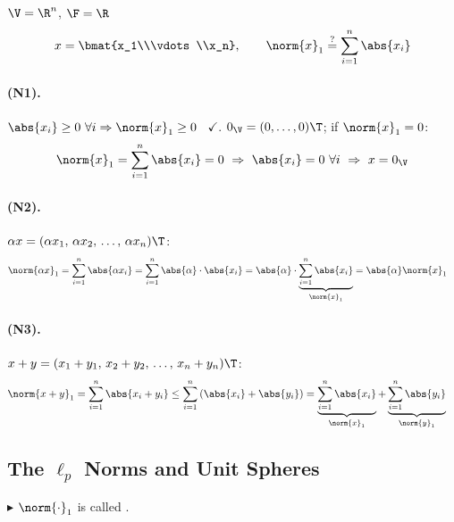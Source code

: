 \begin{example}
$\V=\R^n$, $\F=\R$
\[
x = \bmat{x_1\\\vdots\\x_n}, \qquad \norm{x}_1 \overset{?}{=} \sum_{i=1}^{n}\abs{x_i}
\]
\paragraph{(N1).} $\abs{x_i}\ge0\ \forall i \Rightarrow \norm{x}_1\ge0$ \ $\checkmark$. \quad $0_{\V} = (0,\dots,0)\T$; if $\norm{x}_1=0$:
\[
\norm{x}_1 = \sum_{i=1}^{n}\abs{x_i} = 0
\ \Rightarrow\ \abs{x_i}=0 \ \forall i
\ \Rightarrow\ x=0_{\V}
\]
\paragraph{(N2).} $\alpha x = (\alpha x_1,\, \alpha x_2,\, \dots,\, \alpha x_n)\T$:
\begin{align*}
\norm{\alpha x}_1 &= \sum_{i=1}^{n}\abs{\alpha x_i} = \sum_{i=1}^{n}\abs{\alpha}\cdot\abs{x_i}
= \abs{\alpha}\cdot\underbrace{\sum_{i=1}^{n}\abs{x_i}}_{\norm{x}_1} = \abs{\alpha}\norm{x}_1
\end{align*}

\paragraph{(N3).} $x+y = (x_1+y_1,\, x_2+y_2,\, \dots,\, x_n+y_n)\T$:
\begin{align*}
\norm{x+y}_1 = \sum_{i=1}^{n}\abs{x_i+y_i} &\le \sum_{i=1}^{n}\left(\abs{x_i}+\abs{y_i}\right)
= \underbrace{\sum_{i=1}^{n}\abs{x_i}}_{\norm{x}_1}+\underbrace{\sum_{i=1}^{n}\abs{y_i}}_{\norm{y}_1}
\end{align*}
\end{example}

\subsection{The $\ell_p$ Norms and Unit Spheres}\label{ss:lp}
$\blacktriangleright$ $\norm{\cdot}_1$ is called .

